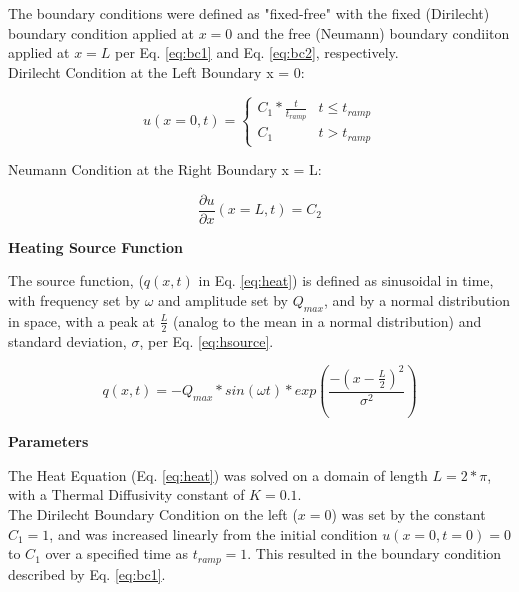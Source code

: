 \documentclass[10pt, letter, showtrims]{extarticle}
\begin{document}
		\noindent
		The boundary conditions were defined as "fixed-free" with the fixed (Dirilecht) boundary condition applied at $x = 0$ and the free (Neumann) boundary condiiton applied at $x = L$ per Eq. \ref{eq:bc1} and Eq. \ref{eq:bc2}, respectively. \\
		
		\noindent
		Dirilecht Condition at the Left Boundary x = 0:
	
		\begin{equation}
		\label{eq:bc1}
			u(x=0, t) = \begin{cases} 
          					C_{1} * \frac{t}{t_{ramp}} & t\leq t_{ramp} \\
          					C_{1}                      & t > t_{ramp}
       					\end{cases}
    		\end{equation}
    
    		\noindent
    		Neumann Condition at the Right Boundary x = L:
    
    		\begin{equation}
    		\label{eq:bc2}
			\frac{\partial u}{\partial x}(x=L, t) = C_{2}
    		\end{equation}		

		\noindent
		\textbf{Heating Source Function}
		
		
		\noindent
		The source function, ($q(x, t)$ in Eq. \ref{eq:heat}) is defined as sinusoidal in time, with frequency set by $\omega$ and amplitude set by $Q_{max}$, and by a normal distribution in space, with a peak at $\frac{L}{2}$ (analog to the mean in a normal distribution) and standard deviation, $\sigma$, per Eq. \ref{eq:hsource}.		
		
		\begin{equation}
		\label{eq:hsource}
			q(x, t) = - Q_{max} * sin(\omega t) * exp\left(\frac{-(x - \frac{L}{2})^{2}}{\sigma^{2}}\right)
		\end{equation}	
		
		\pagebreak
		
		\noindent
		\textbf{Parameters}
		
		\noindent
		The Heat Equation (Eq. \ref{eq:heat}) was solved on a domain of length $L = 2*\pi$, with a Thermal Diffusivity constant of $K = 0.1$. \\
		
		\noindent
		The Dirilecht Boundary Condition on the left ($x = 0$) was set by the constant $C_{1} = 1$, and was increased linearly from the initial condition $u(x = 0, t = 0) = 0$ to $C_{1}$ over a specified time as $t_{ramp} = 1$. This resulted in the boundary condition described by Eq. \ref{eq:bc1}. \\
		
\end{document}
